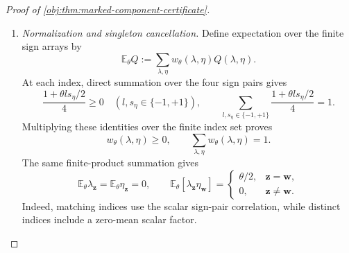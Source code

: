 \begin{proof}[Proof of \cref{obj:thm:marked-component-certificate}]
\begin{enumerate}
Subadditivity and homogeneity of the Hölder norm give
\[
\|aF_\lambda\|_{H^\alpha}\le C_{F,\alpha}c_M,
\qquad
\|bG_\eta\|_{H^\beta}\le C_{F,\beta}c_M,
\]
\[
\|\tau_\theta\|_{H^\gamma}
\le2C_{B,\gamma}c_M,
\qquad
\|\theta abB_h^2\|_{H^\beta}
\le C_{B,\beta}c_M.
\]
Consequently
\[
\|e_\lambda\|_{H^\alpha}
\le\frac12+\frac{\rho}{32}\le L,
\]
\[
\|\mu_{0,\theta,\eta}\|_{H^\beta}
\le\frac12+\frac{\rho}{16}\le L,
\qquad
\|\tau_\theta\|_{H^\gamma}\le\frac{\rho}{16}\le L.
\]
All the prescribed functions are Borel. The independent conditional Bernoulli construction gives uniform covariates and conditional exchangeability, and its conditional margins are exactly the prescribed functions. Together with the preceding bounds, these facts establish every condition in \cref{obj:def:primitive-class}.

To identify the canonical contrast, the prescribed control mean is continuous, and the prescribed treated mean is continuous because it is the sum of the control mean and \(\tau_\theta\). Their admissible designated versions agree with them almost surely by uniqueness of conditional margins. Two continuous versions that agree almost everywhere under the uniform design agree everywhere on the cube: a nonzero continuous difference would persist on a relative neighborhood of positive uniform measure, including at a boundary point. Thus
\[
P_{\theta,\lambda,\eta}\in\mathcal M,
\qquad
\tau_{P_{\theta,\lambda,\eta}}(x)
=
\mu_{1,\theta,\eta}(x)-\mu_{0,\theta,\eta}(x)
=
\tau_\theta(x)
\quad(x\in[0,1]^d).
\]

\item \textit{Normalization and singleton cancellation.}
Define expectation over the finite sign arrays by
\[
\mathbb E_\theta Q
:=
\sum_{\lambda,\eta}
w_\theta(\lambda,\eta)Q(\lambda,\eta).
\]
At each index, direct summation over the four sign pairs gives
\[
\frac{1+\theta l s_\eta/2}{4}\ge0
\quad(l,s_\eta\in\{-1,+1\}),
\qquad
\sum_{l,s_\eta\in\{-1,+1\}}\frac{1+\theta l s_\eta/2}{4}=1.
\]
Multiplying these identities over the finite index set proves
\[
w_\theta(\lambda,\eta)\ge0,
\qquad
\sum_{\lambda,\eta}w_\theta(\lambda,\eta)=1.
\]
The same finite-product summation gives
\[
\mathbb E_\theta\lambda_{\mathbf z}
=
\mathbb E_\theta\eta_{\mathbf z}=0,
\qquad
\mathbb E_\theta[\lambda_{\mathbf z}\eta_{\mathbf w}]
=
\begin{cases}
\theta/2,&\mathbf z=\mathbf w,\\
0,&\mathbf z\ne\mathbf w.
\end{cases}
\]
Indeed, matching indices use the scalar sign-pair correlation, while distinct indices include a zero-mean scalar factor.


\end{enumerate}
\end{proof}
